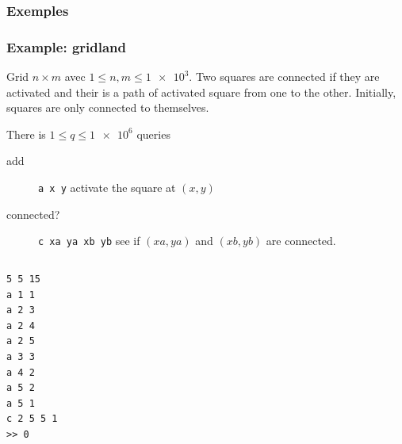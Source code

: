 \documentclass[10pt,svgnames,usenames,table]{beamer} %
\begin{document}
\subsubsection{Exemples}
\begin{frame}
  \frametitle{Example: gridland}
  Grid $n \times m$ avec $1 \leq n, m \leq \num{1e3}$.
  Two squares are connected if they are activated and their is a path of activated square from one to the other.
  Initially, squares are only connected to themselves.

  There is $1 \leq q \leq \num{1e6}$ queries
  \begin{description}
    \item[add] \verb|a x y| activate the square at $(x, y)$
    \item[connected?] \verb|c xa ya xb yb| see if $(xa, ya)$ and $(xb, yb)$ are connected.
  \end{description}
  \framebreak
  \begin{columns}
    \begin{column}{0.3\textwidth}
      \begin{verbatim}
5 5 15
a 1 1
a 2 3
a 2 4
a 2 5
a 3 3
a 4 2
a 5 2
a 5 1
c 2 5 5 1
>> 0
      \end{verbatim}
    \end{column}


\end{columns}
\end{frame}
\end{document}
